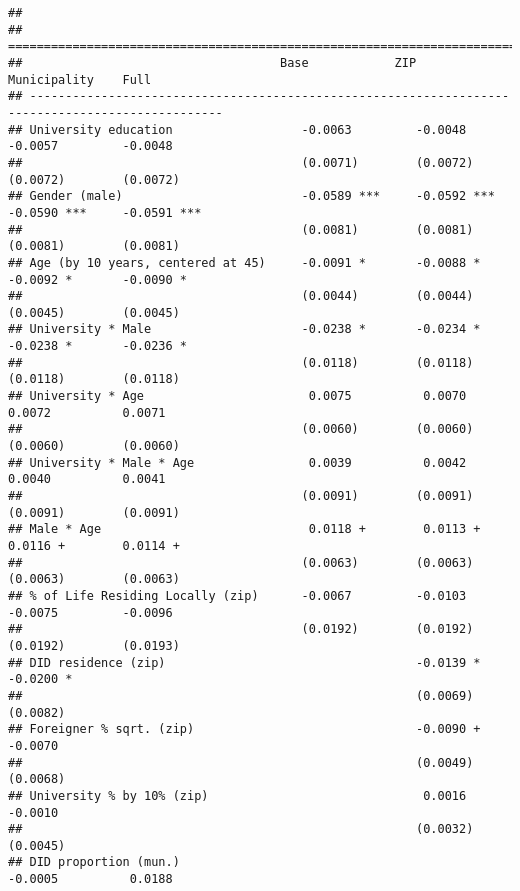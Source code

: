 \documentclass[
]{article}
\begin{document}
\begin{verbatim}
## 
## =================================================================================================
##                                    Base            ZIP             Municipality    Full          
## -------------------------------------------------------------------------------------------------
## University education                  -0.0063         -0.0048         -0.0057         -0.0048    
##                                       (0.0071)        (0.0072)        (0.0072)        (0.0072)   
## Gender (male)                         -0.0589 ***     -0.0592 ***     -0.0590 ***     -0.0591 ***
##                                       (0.0081)        (0.0081)        (0.0081)        (0.0081)   
## Age (by 10 years, centered at 45)     -0.0091 *       -0.0088 *       -0.0092 *       -0.0090 *  
##                                       (0.0044)        (0.0044)        (0.0045)        (0.0045)   
## University * Male                     -0.0238 *       -0.0234 *       -0.0238 *       -0.0236 *  
##                                       (0.0118)        (0.0118)        (0.0118)        (0.0118)   
## University * Age                       0.0075          0.0070          0.0072          0.0071    
##                                       (0.0060)        (0.0060)        (0.0060)        (0.0060)   
## University * Male * Age                0.0039          0.0042          0.0040          0.0041    
##                                       (0.0091)        (0.0091)        (0.0091)        (0.0091)   
## Male * Age                             0.0118 +        0.0113 +        0.0116 +        0.0114 +  
##                                       (0.0063)        (0.0063)        (0.0063)        (0.0063)   
## % of Life Residing Locally (zip)      -0.0067         -0.0103         -0.0075         -0.0096    
##                                       (0.0192)        (0.0192)        (0.0192)        (0.0193)   
## DID residence (zip)                                   -0.0139 *                       -0.0200 *  
##                                                       (0.0069)                        (0.0082)   
## Foreigner % sqrt. (zip)                               -0.0090 +                       -0.0070    
##                                                       (0.0049)                        (0.0068)   
## University % by 10% (zip)                              0.0016                         -0.0010    
##                                                       (0.0032)                        (0.0045)   
## DID proportion (mun.)                                                 -0.0005          0.0188    

\end{verbatim}
\end{document}
